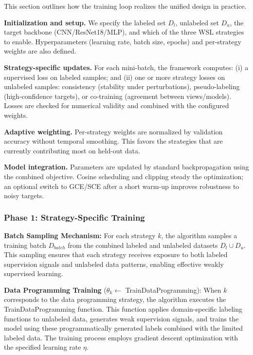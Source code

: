 \documentclass{ieeeaccess}
\begin{document}
This section outlines how the training loop realizes the unified design in practice.

\textbf{Initialization and setup.} We specify the labeled set $D_l$, unlabeled set $D_u$, the target backbone (CNN/ResNet18/MLP), and which of the three WSL strategies to enable. Hyperparameters (learning rate, batch size, epochs) and per-strategy weights are also defined.

\textbf{Strategy-specific updates.} For each mini-batch, the framework computes: (i) a supervised loss on labeled samples; and (ii) one or more strategy losses on unlabeled samples: consistency (stability under perturbations), pseudo-labeling (high-confidence targets), or co-training (agreement between views/models). Losses are checked for numerical validity and combined with the configured weights.

\textbf{Adaptive weighting.} Per-strategy weights are normalized by validation accuracy without temporal smoothing. This favors the strategies that are currently contributing most on held-out data.

\textbf{Model integration.} Parameters are updated by standard backpropagation using the combined objective. Cosine scheduling and clipping steady the optimization; an optional switch to GCE/SCE after a short warm-up improves robustness to noisy targets.

\subsubsection{Phase 1: Strategy-Specific Training}

\textbf{Batch Sampling Mechanism:} For each strategy $k$, the algorithm samples a training batch $D_{batch}$ from the combined labeled and unlabeled datasets $D_l \cup D_u$. This sampling ensures that each strategy receives exposure to both labeled supervision signals and unlabeled data patterns, enabling effective weakly supervised learning.

\textbf{Data Programming Training} ($\theta_k \leftarrow$ TrainDataProgramming): When $k$ corresponds to the data programming strategy, the algorithm executes the TrainDataProgramming function. This function applies domain-specific labeling functions to unlabeled data, generates weak supervision signals, and trains the model using these programmatically generated labels combined with the limited labeled data. The training process employs gradient descent optimization with the specified learning rate $\eta$.
\end{document}
